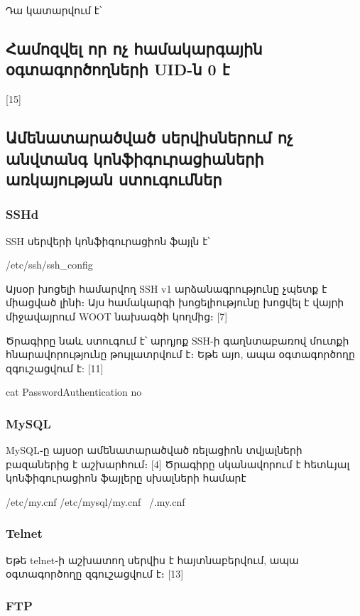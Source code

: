 \documentclass[10pt]{article}
\begin{document}
\begin{sloppypar}
Դա կատարվում է՝



\subsection{Համոզվել որ ոչ համակարգային օգտագործողների UID-ն 0 է}

[15]


\subsection{Ամենատարածված սերվիսներում ոչ անվտանգ կոնֆիգուրացիաների առկայության ստուգումներ}

\subsubsection{SSHd}

SSH սերվերի կոնֆիգուրացիոն ֆայլն է՝

    /etc/ssh/ssh\_config

Այսօր խոցելի համարվող SSH v1 արձանագրությունը չպետք է միացված լինի։
Այս համակարգի խոցելիությունը խոցվել է վայրի միջավայրում WOOT
նախագծի կողմից։ [7]

Ծրագիրը նաև ստուգում է՝ արդյոք SSH-ի գաղնտաբառով մուտքի
հնարավորությունը թույլատրվում է։ Եթե այո, ապա օգտագործողը
զգուշացվում է: [11]

    cat PasswordAuthentication no

\subsubsection{MySQL}

MySQL֊ը այսօր ամենատարածված ռելացիոն տվյալների բազաներից է աշխարհում։ [4]
Ծրագիրը սկանավորում է հետևյալ կոնֆիգուրացիոն ֆայլերը սխալների համարէ

    /etc/my.cnf
    /etc/mysql/my.cnf
    ~/.my.cnf

\subsubsection{Telnet}

Եթե telnet֊ի աշխատող սերվիս է հայտնաբերվում, ապա օգտագործողը զգուշացվում է։
[13]

\subsubsection{FTP}


\end{sloppypar}
\end{document}
